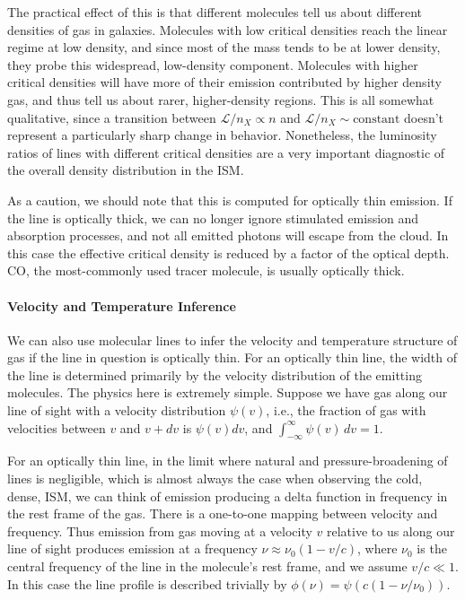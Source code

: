 The practical effect of this is that different molecules tell us about different densities of gas in galaxies. Molecules with low critical densities reach the linear regime at low density, and since most of the mass tends to be at lower density, they probe this widespread, low-density component. Molecules with higher critical densities will have more of their emission contributed by higher density gas, and thus tell us about rarer, higher-density regions. This is all somewhat qualitative, since a transition between $\mathcal{L}/n_X \propto n$ and $\mathcal{L}/n_X \sim\mbox{constant}$ doesn't represent a particularly sharp change in behavior. Nonetheless, the luminosity ratios of lines with different critical densities are a very important diagnostic of the overall density distribution in the ISM.

As a caution, we should note that this is computed for optically thin emission. If the line is optically thick, we can no longer ignore stimulated emission and absorption processes, and not all emitted photons will escape from the cloud. In this case the effective critical density is reduced by a factor of the optical depth. CO, the most-commonly used tracer molecule, is usually optically thick.

\paragraph{Velocity and Temperature Inference}

We can also use molecular lines to infer the velocity and temperature structure of gas if the line in question is optically thin. For an optically thin line, the width of the line is determined primarily by the velocity distribution of the emitting molecules. The physics here is extremely simple. Suppose we have gas along our line of sight with a velocity distribution $\psi(v)$, i.e., the fraction of gas with velocities between $v$ and $v+dv$ is $\psi(v) dv$, and $\int_{-\infty}^{\infty} \psi(v) \, dv = 1$.

For an optically thin line, in the limit where natural and pressure-broadening of lines is negligible, which is almost always the case when observing the cold, dense, ISM, we can think of emission producing a delta function in frequency in the rest frame of the gas. There is a one-to-one mapping between velocity and frequency. Thus emission from gas moving at a velocity $v$ relative to us along our line of sight produces emission at a frequency $\nu \approx \nu_0 (1 - v/c)$, where $\nu_0$ is the central frequency of the line in the molecule's rest frame, and we assume $v/c \ll 1$. In this case the line profile is described trivially by $\phi(\nu)=\psi(c(1-\nu/\nu_0))$. 

